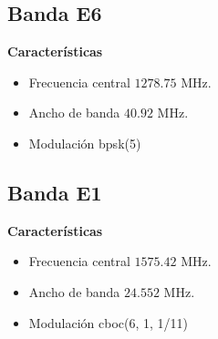 \subsection{Banda E6}

\begin{justify}
    \textbf{Características}
    \begin{itemize}
        \item Frecuencia central $1278.75$ MHz.
        \item Ancho de banda $40.92$ MHz.
        \item Modulación \gls{bpsk}(5)
    \end{itemize}
\end{justify}

\subsection{Banda E1}

\begin{justify}
    \textbf{Características}
    \begin{itemize}
        \item Frecuencia central $1575.42$ MHz.
        \item Ancho de banda $24.552$ MHz.
        \item Modulación \acrshort{cboc}(6, 1, 1/11)
    \end{itemize}
\end{justify}